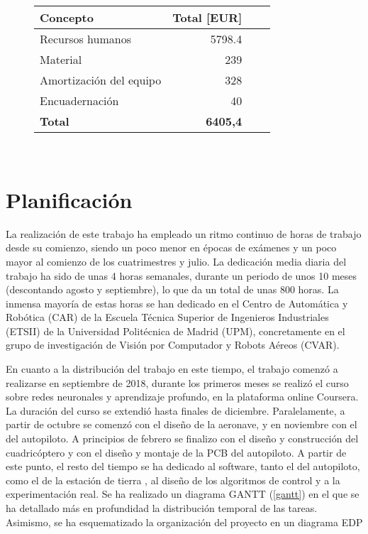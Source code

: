 \begin{figure}[htb!]
	\centering
	\begin{tabular}{|l|r|r|r|}
		\hline
		\textbf{Concepto} &Total [EUR]\\
		\hline
		Recursos humanos & 5798.4\\
		Material &239\\
		Amortización del equipo & 328\\
		Encuadernación&40\\
		
		\hline
		\textbf{Total}   & \textbf{6405,4}\\
		\hline
	\end{tabular}\\
\end{figure}





\section{Planificación}
La realización de este trabajo ha empleado un ritmo continuo de horas de trabajo desde su comienzo, siendo un poco menor en épocas de exámenes y un poco mayor al comienzo de los cuatrimestres y julio. La dedicación media diaria del trabajo ha sido de unas 4 horas semanales, durante un periodo de unos 10 meses (descontando agosto y septiembre), lo que da un total de unas 800 horas. La inmensa mayoría de estas horas se han dedicado en el Centro de Automática y Robótica (CAR) de la Escuela Técnica Superior de Ingenieros Industriales (ETSII) de la Universidad Politécnica de Madrid (UPM), concretamente en el grupo de investigación de Visión por Computador y Robots Aéreos (CVAR).

En cuanto a la distribución del trabajo en este tiempo, el trabajo comenzó a realizarse en septiembre de 2018, durante los primeros meses se realizó el curso sobre redes neuronales y aprendizaje profundo, en la plataforma online Coursera. La duración del curso se extendió hasta finales de diciembre. Paralelamente, a partir de octubre se comenzó con el diseño de la aeronave, y en noviembre con el del autopiloto. A principios de febrero se finalizo con el diseño y construcción del cuadricóptero y con el diseño y montaje de la PCB del autopiloto. A partir de este punto, el resto del tiempo se ha dedicado al software, tanto el del autopiloto, como el de la estación de tierra , al diseño de los algoritmos de control y a la experimentación real. Se ha realizado un diagrama GANTT (\cref{gantt}) en el que se ha detallado más en profundidad la distribución temporal de las tareas. Asimismo, se ha esquematizado la organización del proyecto en un diagrama EDP 


